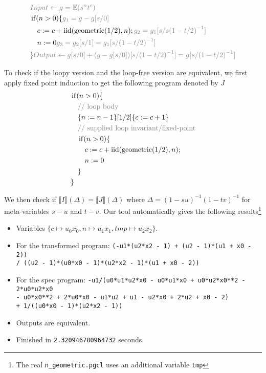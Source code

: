 \documentclass[a4paper]{article}
\DeclareMathOperator*{\iid}{iid}
\renewcommand{\S}[1]{ \llbracket #1 \rrbracket }
\newcommand{\E}{ \mathbb{E} }
\newcommand{\Geom}{\mathrm{geometric}}
\newcommand{\Anno}[1]{\color{gray}{#1}}
\begin{document}
\begin{align*}
	 & \Anno{Input \gets g = \E(s^n t^c)}                                                 \\
	 & \operatorname{if} (n>0) \{ \Anno{g_1 = g-g[s/0]}                                   \\
	 & \quad c := c + \iid(\Geom(1/2),n) ; \Anno{g_2 = g_1[s/s {(1-t/2)}^{-1}]}           \\
	 & \quad n := 0 \Anno{g_3 = g_2[s/1] = g_1[s/{(1-t/2)}^{-1}]}                         \\
	 & \} \Anno{Output \gets g[s/0] + (g-g[s/0])[s/{(1-t/2)}^{-1}] = g[s/{(1-t/2)}^{-1}]} \\
\end{align*}

To check if the loopy version and the loop-free version are equivalent,
we first apply fixed point induction to get the following program denoted by \(J\)
\begin{align*}
	 & \operatorname{if} (n > 0) \{                               \\
	 & \quad \Anno{\text{// loop body}}                           \\
	 & \quad \{n := n-1\}[1/2]\{c := c+1\}                        \\
	 & \quad \Anno{\text{// supplied loop invariant/fixed-point}} \\
	 & \quad \operatorname{if} (n > 0) \{                         \\
	 & \qquad c := c + \iid(\Geom(1/2),n);                        \\
	 & \qquad n := 0                                              \\
	 & \quad \}                                                   \\
	 & \}                                                         \\
\end{align*}

We then check if \(\S{I}(\Delta)=\S{J}(\Delta)\) where \(\Delta = {(1-s u)}^{-1} {(1-t v)}^{-1}\) for meta-variables \(s-u\) and \(t-v\).
Our tool automatically gives the following results\footnote{The real \texttt{n\_geometric.pgcl} uses an additional variable \texttt{tmp}}

\begin{itemize}
	\item Variables \(\{c\mapsto u_0x_0, n\mapsto u_1x_1, tmp\mapsto u_2x_2\}\).
	\item For the transformed program:
	      \texttt{(-u1*(u2*x2 - 1) + (u2 - 1)*(u1 + x0 - 2)) \\ / ((u2 - 1)*(u0*x0 - 1)*(u2*x2 - 1)*(u1 + x0 - 2))}
	\item For the spec program:
	      \texttt{-u1/(u0*u1*u2*x0 - u0*u1*x0 + u0*u2*x0**2 - 2*u0*u2*x0 \\ - u0*x0**2 + 2*u0*x0 - u1*u2 + u1 - u2*x0 + 2*u2 + x0 - 2) \\ + 1/((u0*x0 - 1)*(u2*x2 - 1))}
	\item Outputs are equivalent.
	\item Finished in \texttt{2.320946780964732} seconds.
\end{itemize}
\end{document}
